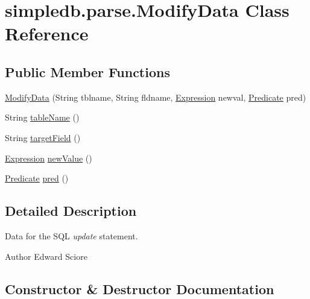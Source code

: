 \hypertarget{classsimpledb_1_1parse_1_1ModifyData}{}\section{simpledb.\+parse.\+Modify\+Data Class Reference}
\label{classsimpledb_1_1parse_1_1ModifyData}
\subsection*{Public Member Functions}
\begin{DoxyCompactItemize}
\item 
\hyperlink{classsimpledb_1_1parse_1_1ModifyData_a1b976f3da407f0b77e28a2cfc43f52db}{Modify\+Data} (String tblname, String fldname, \hyperlink{classsimpledb_1_1query_1_1Expression}{Expression} newval, \hyperlink{classsimpledb_1_1query_1_1Predicate}{Predicate} pred)
\item 
String \hyperlink{classsimpledb_1_1parse_1_1ModifyData_a34e80328d0a9fdbcb906908328c854c9}{table\+Name} ()
\item 
String \hyperlink{classsimpledb_1_1parse_1_1ModifyData_a54ff6b92596e40f3fc297e23c5cd8dc1}{target\+Field} ()
\item 
\hyperlink{classsimpledb_1_1query_1_1Expression}{Expression} \hyperlink{classsimpledb_1_1parse_1_1ModifyData_a4bbcd89228fdd081bdd5ec42f761c5eb}{new\+Value} ()
\item 
\hyperlink{classsimpledb_1_1query_1_1Predicate}{Predicate} \hyperlink{classsimpledb_1_1parse_1_1ModifyData_aa81f40c1844cc995612d93ce3b31de45}{pred} ()
\end{DoxyCompactItemize}


\subsection{Detailed Description}
Data for the S\+QL {\itshape update} statement. \begin{DoxyAuthor}{Author}
Edward Sciore 
\end{DoxyAuthor}


\subsection{Constructor \& Destructor Documentation}
\mbox{\label{classsimpledb_1_1parse_1_1ModifyData_a1b976f3da407f0b77e28a2cfc43f52db}} 
